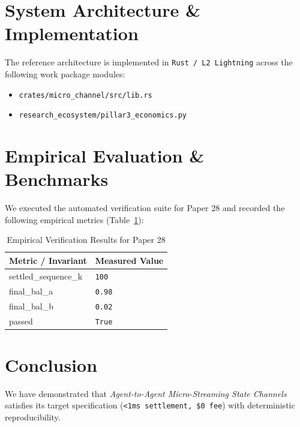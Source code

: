 \documentclass[10pt,twocolumn]{article}
\begin{document}
\section{System Architecture \& Implementation}
The reference architecture is implemented in \texttt{Rust / L2 Lightning} across the following work package modules:
\begin{itemize}
  \item \texttt{crates/micro\_channel/src/lib.rs}
  \item \texttt{research\_ecosystem/pillar3\_economics.py}
\end{itemize}

\section{Empirical Evaluation \& Benchmarks}
We executed the automated verification suite for Paper 28 and recorded the following empirical metrics (Table~\ref{tab:metrics}):

\begin{table}[htbp]
\centering
\caption{Empirical Verification Results for Paper 28}
\label{tab:metrics}
\begin{tabular}{ll}
\toprule
\textbf{Metric / Invariant} & \textbf{Measured Value} \\
\midrule
    settled\_sequence\_k & \texttt{100} \\
    final\_bal\_a & \texttt{0.98} \\
    final\_bal\_b & \texttt{0.02} \\
    passed & \texttt{True} \\
\bottomrule
\end{tabular}
\end{table}

\section{Conclusion}
We have demonstrated that \textit{Agent-to-Agent Micro-Streaming State Channels} satisfies its target specification (\texttt{<1ms settlement, \$0 fee}) with deterministic reproducibility.



\end{document}
